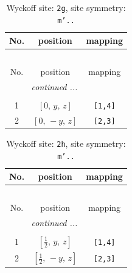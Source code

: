 \documentclass[fleqn,8pt]{jsarticle}
\begin{document}
\renewcommand{\arraystretch}{1.2}
\begin{longtable}{ccc}
\caption{Wyckoff site: {\tt 2g}, site symmetry: {\tt m'..}}
 \\
 \hline \hline
No. & position & mapping \\ \hline \endfirsthead

\multicolumn{2}{l}{\tablename\ \thetable{}} \\
 \hline \hline
No. & position & mapping \\ \hline \endhead

 \hline \hline
\multicolumn{2}{r}{\footnotesize\it continued ...} \\ \endfoot

 \hline \hline
\multicolumn{2}{r}{} \\ \endlastfoot

1 & $\left[ 0,\, y,\, z \right]$ & {\tt [1,4]} \\ \hline
2 & $\left[ 0,\, - y,\, z \right]$ & {\tt [2,3]} \\
\end{longtable}
\renewcommand{\arraystretch}{1.2}
\begin{longtable}{ccc}
\caption{Wyckoff site: {\tt 2h}, site symmetry: {\tt m'..}}
 \\
 \hline \hline
No. & position & mapping \\ \hline \endfirsthead

\multicolumn{2}{l}{\tablename\ \thetable{}} \\
 \hline \hline
No. & position & mapping \\ \hline \endhead

 \hline \hline
\multicolumn{2}{r}{\footnotesize\it continued ...} \\ \endfoot

 \hline \hline
\multicolumn{2}{r}{} \\ \endlastfoot

1 & $\left[ \frac{1}{2},\, y,\, z \right]$ & {\tt [1,4]} \\ \hline
2 & $\left[ \frac{1}{2},\, - y,\, z \right]$ & {\tt [2,3]} \\
\end{longtable}
\renewcommand{\arraystretch}{1.2}
\end{document}

